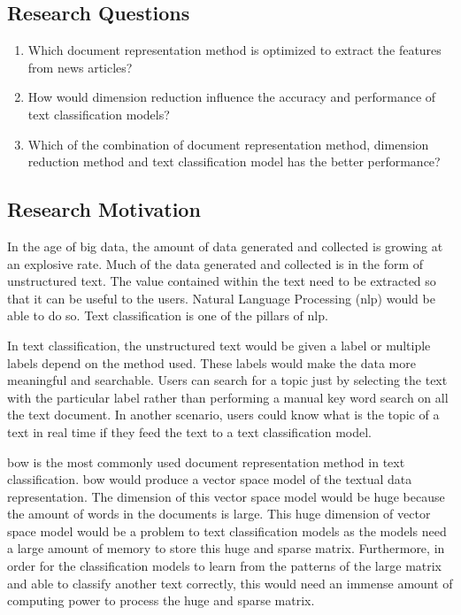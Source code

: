 \subsection{Research Questions}
\begin{enumerate}
	\item Which document representation method is optimized to extract the features from news articles?
	\item How would dimension reduction influence the accuracy and performance of text classification models?
	\item Which of the combination of document representation method, dimension reduction method and text classification model has the better performance?
\end{enumerate}

\subsection{Research Motivation}
In the age of big data, the amount of data generated and collected is growing at an explosive rate. Much of the data generated and collected is in the form of unstructured text. The value contained within the text need to be extracted so that it can be useful to the users. Natural Language Processing (\ac{nlp}) would be able to do so. Text classification is one of the pillars of \ac{nlp}.

In text classification, the unstructured text would be given a label or multiple labels depend on the method used. These labels would make the data more meaningful and searchable. Users can search for a topic just by selecting the text with the particular label rather than performing a manual key word search on all the text document. In another scenario, users could know what is the topic of a text in real time if they feed the text to a text classification model.

\ac{bow} is the most commonly used document representation method in text classification. \Ac{bow} would produce a vector space model of the textual data representation. The dimension of this vector space model would be huge because the amount of words in the documents is large. This huge dimension of vector space model would be a problem to text classification models as the models need a large amount of memory to store this huge and sparse matrix. Furthermore, in order for the classification models to learn from the patterns of the large matrix and able to classify another text correctly, this would need an immense amount of computing power to process the huge and sparse matrix.


